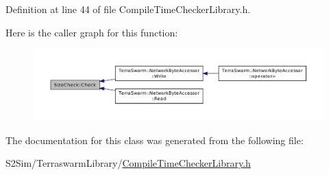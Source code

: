 Definition at line 44 of file Compile\-Time\-Checker\-Library.\-h.



Here is the caller graph for this function\-:\nopagebreak
\begin{figure}[H]
\begin{center}
\leavevmode
\includegraphics[width=350pt]{class_size_check_a5e3ffed91b912bc4b3f8b3290dc64351_icgraph}
\end{center}
\end{figure}




The documentation for this class was generated from the following file\-:\begin{DoxyCompactItemize}
\item 
S2\-Sim/\-Terraswarm\-Library/\hyperlink{_compile_time_checker_library_8h}{Compile\-Time\-Checker\-Library.\-h}\end{DoxyCompactItemize}

